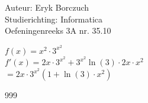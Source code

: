 \documentclass[a4paper]{article}
\begin{document}
  
\noindent \large Auteur: Eryk Borczuch \\
\noindent \large Studierichting: Informatica\\
\noindent \large Oefeningenreeks 3A nr. 35.10\\

\medskip

\normalsize

$f(x) = x^2 \cdot 3^{x^2}$\\

$ f'(x) = 2x \cdot 3^{x^2} + 3^{x^2} \ln (3) \cdot 2x \cdot x^2$\\

$= 2x \cdot3^{x^2}(1+ \ln(3) \cdot x^2)$\\

\begin{thebibliography}{999}
\end{thebibliography}
\end{document}
